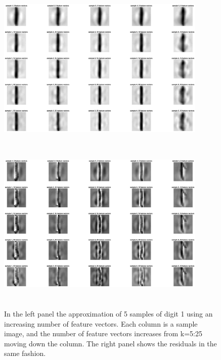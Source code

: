 \documentclass{article}
\begin{document}
    \begin{figure}[!h]
        \centerline
        {
        \includegraphics[width=10cm, height=8cm] {Q_2_1_approx}\includegraphics[width=10cm, height=8cm]{Q_2_1_residual}
        }
        \caption{\label{fig:my figure} In the left panel the approximation of 5 samples of digit 1 using an increasing number of feature vectors.  Each column is a sample image, and the number of feature vectors increases from k=5:25 moving down the column.  The right panel shows the residuals in the same fashion.}
    \end{figure}
    
\end{document}
